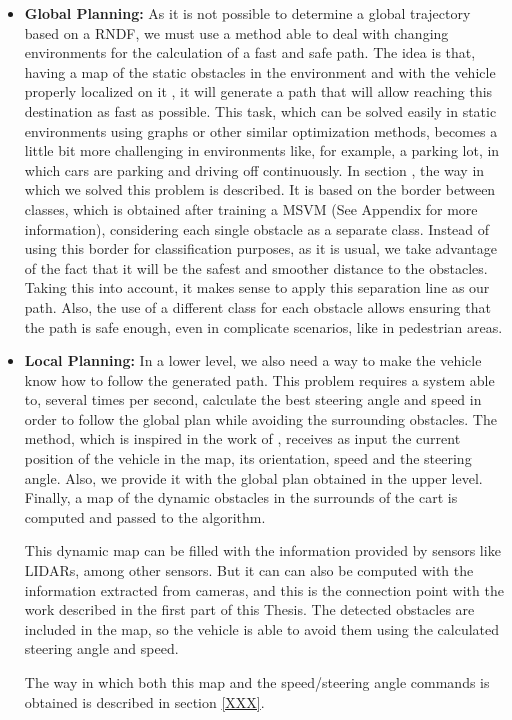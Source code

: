 \begin{itemize}
 \item \textbf{Global Planning:}
 As it is not possible to determine a global trajectory based on a \ac{RNDF}, we must use a method able to deal with changing environments for the calculation of a fast and safe path. The idea is that, having a map of the static obstacles in the environment and with the vehicle properly localized on it \cite{Perea2013mcl}, it will generate a path that will allow reaching this destination as fast as possible. This task, which can be solved easily in static environments using graphs or other similar optimization methods, becomes a little bit more challenging in environments like, for example, a parking lot, in which cars are parking and driving off continuously.
 In section \todo{ \ref{XXX} }, the way in which we solved this problem is described. It is based on the border between classes, which is obtained after training a \ac{MSVM} (See Appendix \todo {\ref{XXX}} for more information), considering each single obstacle as a separate class. Instead of using this border for classification purposes, as it is usual, we take advantage of the fact that it will be the safest and smoother distance to the obstacles. Taking this into account, it makes sense to apply this separation line as our path. Also, the use of a different class for each obstacle allows ensuring that the path is safe enough, even in complicate scenarios, like in pedestrian areas.
 
 \item \textbf{Local Planning:}
 In a lower level, we also need a way to make the vehicle know how to follow the generated path. This problem requires a system able to, several times per second, calculate the best steering angle and speed in order to follow the global plan while avoiding the surrounding obstacles. The method, which is inspired in the work of \cite{chu2012local}, receives as input the current position of the vehicle in the map, its orientation, speed and the steering angle. Also, we provide it with the global plan obtained in the upper level. Finally, a map of the dynamic obstacles in the surrounds of the cart is computed and passed to the algorithm.
 
 This dynamic map can be filled with the information provided by sensors like \acp{LIDAR}, among other sensors. But it can can also be computed with the information extracted from cameras, and this is the connection point with the work described in the first part of this Thesis. The detected obstacles are included in the map, so the vehicle is able to avoid them using the calculated steering angle and speed.
 
 The way in which both this map and the speed/steering angle commands is obtained is described in section \ref{XXX}.
\end{itemize}
 
